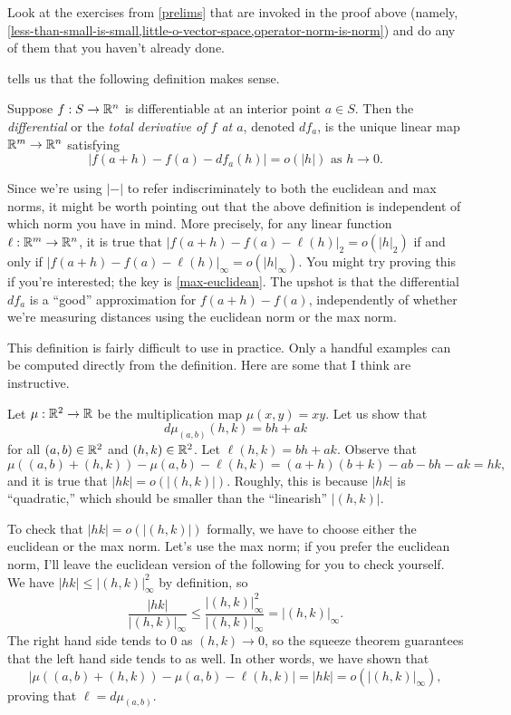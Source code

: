 \begin{exercise}
	Look at the exercises from \cref{prelims} that are invoked in the proof above (namely, \cref{less-than-small-is-small,little-o-vector-space,operator-norm-is-norm}) and do any of them that you haven't already done.
\end{exercise}

 tells us that the following definition makes sense.  

\begin{definition} 
	Suppose $f : S \to \mathbb{R}^n$ is differentiable at an interior point $a \in S$. Then the \emph{differential} or the \emph{total derivative of $f$ at $a$}, denoted $df_a$, is the unique linear map $\mathbb{R}^m \to \mathbb{R}^n$ satisfying
	\[ |f(a+h)-f(a)-df_a(h)| = o(|h|) \text{ as } h \to 0.  \]
\end{definition}

\begin{pedanticremark}
	Since we're using $|-|$ to refer indiscriminately to both the euclidean and max norms, it might be worth pointing out that the above definition is independent of which norm you have in mind. More precisely, for any linear function $\ell : \mathbb{R}^m \to \mathbb{R}^n$, it is true that $|f(a+h)-f(a)-\ell(h)|_2 = o(|h|_2)$ if and only if $|f(a+h)-f(a)-\ell(h)|_\infty = o(|h|_\infty)$. You might try proving this if you're interested; the key is \cref{max-euclidean}. The upshot is that the differential $df_a$ is a ``good'' approximation for $f(a+h)-f(a)$, independently of whether we're measuring distances using the euclidean norm or the max norm. 
\end{pedanticremark}

This definition is fairly difficult to use in practice. Only a handful examples can be computed directly from the definition. Here are some that I think are instructive.

\begin{example} \label{derivative-of-multiplication}
	Let $\mu : \mathbb{R}^2 \to \mathbb{R}$ be the multiplication map $\mu(x, y) = xy$. Let us show that 
	\[ d\mu_{(a,b)}(h, k) = bh + ak \]
	for all $(a,b) \in \mathbb{R}^2$ and $(h,k) \in \mathbb{R}^2$. Let $\ell(h,k) = bh + ak$. Observe that 
	\[ \mu((a,b)+(h,k)) - \mu(a,b) - \ell(h,k) = (a+h)(b+k) - ab - bh - ak = hk, \]
	and it is true that $|hk| = o(|(h,k)|)$. Roughly, this is because $|hk|$ is ``quadratic,'' which should be smaller than the ``linearish'' $|(h,k)|$. 
	
	To check that $|hk| = o(|(h,k)|)$ formally, we have to choose either the euclidean or the max norm. Let's use the max norm; if you prefer the euclidean norm, I'll leave the euclidean version of the following for you to check yourself. We have $|hk| \leq |(h,k)|_\infty^2$ by definition, so 
	\[ \frac{|hk|}{|(h,k)|_\infty} \leq \frac{|(h,k)|_\infty^2}{|(h,k)|_\infty} = |(h,k)|_\infty. \]
	The right hand side tends to 0 as $(h,k) \to 0$, so the squeeze theorem guarantees that the left hand side tends to as well. In other words, we have shown that 
	\[ |\mu((a,b)+(h,k)) - \mu(a,b) - \ell(h,k)| = |hk| = o(|(h,k)|_\infty), \]
	proving that $\ell = d\mu_{(a,b)}$. 
\end{example}

